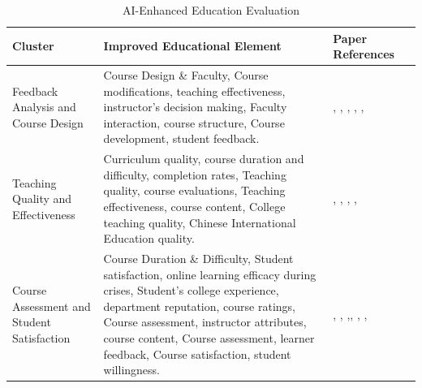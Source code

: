 \begin{table}
    \centering
    \caption{AI-Enhanced Education Evaluation}
    \label{tab:AI_education_evaluation}
    \begin{tabularx}{\textwidth}{|X|X|X|X|}
        \hline
        \textbf{Cluster} & \textbf{Improved Educational Element} & \textbf{Paper References} \\
        \hline
        Feedback Analysis and Course Design & Course Design \& Faculty, Course modifications, teaching effectiveness, instructor's decision making, Faculty interaction, course structure, Course development, student feedback. & \cite{Palaute:_An_Online_Text_Mining_Tool_for_Analyzing_Written_Student_Course_Feedback}, \cite{SUFAT_An_Analytics_Tool_for_Gaining_Insights_from_Student_Feedback_Comments}, \cite{Analyzing_educational_comments_for_topics_and_sentiments:_A_text_analytics_approach}, \cite{Improving_MOOC_quality_using_learning_analytics_and_tools}, \cite{Visualizing_Student_Opinion_Through_Text_Analysis}, \cite{Online_reviews_evaluation_system_for_higher_education_institution:_An_aspect_based_sentiment_analysis_tool} \\
        \hline
        Teaching Quality and Effectiveness & Curriculum quality, course duration and difficulty, completion rates, Teaching quality, course evaluations, Teaching effectiveness, course content, College teaching quality, Chinese International Education quality. & \cite{Competition_Neural_Network_Model_Application_in_the_Bilingual_Teaching_Quality_Evaluation_of_Universities}, \cite{Evaluating_the_quality_of_teaching_in_higher_education_institutes_using_clustering_approach_and_set_pair_analysis}, \cite{Research_on_Project-Based_Teaching_Quality_Evaluation_Based_on_Fuzzy_Cluster_Analysis}, \cite{Research_on_the_Application_of_BP_Neural_Network_in_the_Evaluation_of_College_Teaching_Quality}, \cite{An_Improved_BP_Neural_Network-Based_Quality_Evaluation_Model_for_Chinese_International_Education_Teaching_Courses} \\
        \hline
        Course Assessment and Student Satisfaction & Course Duration \& Difficulty, Student satisfaction, online learning efficacy during crises, Student's college experience, department reputation, course ratings, Course assessment, instructor attributes, course content, Course assessment, learner feedback, Course satisfaction, student willingness. & \cite{Experience_in_learners_review_to_determine_attribute_relation_for_course_completion}, \cite{An_Efficient_Data_Mining_Technique_for_Assessing_Satisfaction_Level_With_Online_Learning_for_Higher_Education_Students_During_the_COVID-19}, \cite{Romanov},\cite{Understanding_Students_Online_Reviews_to_Improve_College_Experience_and_Graduation_Rates_of_STEM_Programs_at_the_Largest_Post-Secondary_Institution_A_Learner-Centered_Study}, \cite{What_predicts_student_satisfaction_with_MOOCs:_A_gradient_boosting_trees_supervised_machine_learning_and_sentiment_analysis_approach}, \cite{Assessing_learners_satisfaction_in_collaborative_online_courses_through_a_big_data_approach}, \cite{Course_Satisfaction_in_Engineering_Education_Through_the_Lens_of_Student_Agency_Analytics} \\

\end{tabularx}
\end{table}
